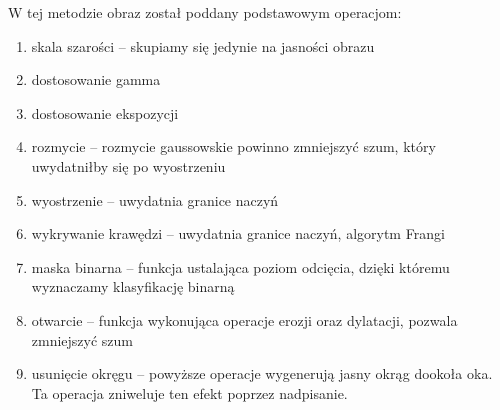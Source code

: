 \documentclass[polish,polish,a4paper]{article}
\begin{document}
		W tej metodzie obraz został poddany podstawowym operacjom:
			\begin{enumerate}
				\item skala szarości -- 
					skupiamy się jedynie na jasności obrazu
					
				\item dostosowanie gamma
				
				\item dostosowanie ekspozycji
				
				\item rozmycie --
					rozmycie gaussowskie  powinno zmniejszyć szum, który uwydatniłby się po wyostrzeniu
				
				\item wyostrzenie --
					uwydatnia granice naczyń
					
				\item wykrywanie krawędzi --
					uwydatnia granice naczyń, algorytm Frangi
					
				\item maska binarna -- 
					funkcja ustalająca poziom odcięcia, 
					dzięki któremu wyznaczamy klasyfikację binarną
					
				\item otwarcie -- 
					funkcja wykonująca operacje erozji oraz dylatacji, 
					pozwala zmniejszyć szum
					
				\item usunięcie okręgu -- 
					powyższe operacje wygenerują jasny okrąg dookoła oka. Ta operacja zniweluje ten efekt poprzez nadpisanie.
			\end{enumerate}
			
\end{document}
